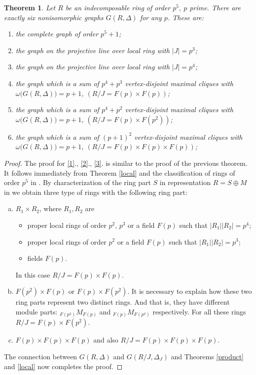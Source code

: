 \documentclass[12pt,a4paper]{article}
\newtheorem{theorem}{Theorem}
\theoremstyle{definition}
\begin{document}
\begin{theorem}
Let $R$ be an indecomposable ring of order $p^5, \ p$ prime. There are exactly six nonisomorphic graphs $G(R, \Delta)$ for any $p$. These are: 
\begin{enumerate}
\item \label{1} the complete graph of order  $p^5+1$;
\item\label{2} the graph on the projective line over local ring with $|J|=p^3$;
\item\label{3} the graph on the projective line over local ring with $|J|=p^4$;
\item\label{4} the graph which is a sum of $p^4+p^3$ vertex-disjoint maximal cliques with $\omega\bigl(G(R, \Delta)\bigr)=p+1$, $(R/J=F(p)\times F(p))$;
\item\label{5} the graph which is a sum of $p^4+p^2$ vertex-disjoint maximal cliques with $\omega\bigl(G(R, \Delta)\bigr)=p+1$, $(R/J=F(p)\times F(p^2))$;
\item\label{6} the graph which is a sum of $(p+1)^2$ vertex-disjoint maximal cliques with $\omega\bigl(G(R, \Delta)\bigr)=p+1$, $(R/J=F(p)\times F(p)\times F(p))$;
\end{enumerate}
\end{theorem}
\begin{proof}
The proof for \ref{1}., \ref{2}., \ref{3}. is similar to the proof of the previous theorem. It follows immediately from Theorem \ref{local} and the classification of rings of order $p^5$ in \cite{p5}.\newline
By characterization of the ring part $S$ in representation $R=S\oplus M$ in \cite{p5} we obtain three type of rings with the following ring part:
\begin{enumerate}[(a)]
\item $R_1\times R_2$, where $R_1, R_2$ are
\begin{itemize}
\item proper local rings of order $p^2$, $p^3$ or a field $F(p)$ such that $|R_1||R_2|=p^4$;
\item proper local rings of order $p^2$ or a field $F(p)$ such that $|R_1||R_2|=p^3$;
\item fields $F(p)$.
\end{itemize}
In this case $R/J=F(p)\times F(p)$.
\item $F(p^2)\times F(p)$ or  $F(p)\times F(p^2)$. It is necessary to explain how these two ring parts represent two distinct rings. And that is, they have different module parts: $_{F(p^2)}M_ {F(p)}$ and $_{F(p)}M_ {F(p^2)}$ respectively. For all these rings $R/J=F(p)\times F(p^2)$.
\item $F(p)\times F(p)\times F(p)$ and also $R/J=F(p)\times F(p)\times F(p)$.
\end{enumerate}
The connection  between $G(R, \Delta)$ and $G(R/J, \Delta_J)$ and Theorems \ref{product} and \ref{local} now completes the proof.
\end{proof}
\end{document}
